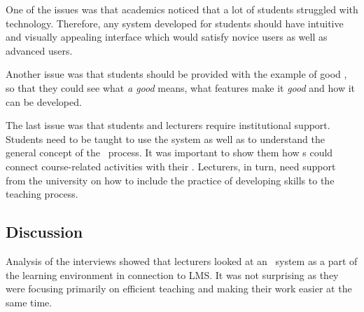 One of the issues was that academics noticed that a lot of students struggled
with technology. Therefore, any system developed for students should have
intuitive and visually appealing interface which would satisfy novice users as
well as advanced users.



Another issue was that students should be provided with the example of good
\ep, so that they could see what \textit{a good \ep} means, what features make
it \textit{good} and how it can be developed.


The last issue was that students and lecturers require institutional support.
Students need to be taught to use the system as well as to understand the
general concept of the \ep~process. It was important to show them how \ep s
could connect course-related activities with their \LLLsn. Lecturers, in turn,
need support from the university on how to include the practice of developing
\LLLs skills to the teaching process.

 
\subsection{Discussion}
Analysis of the interviews showed that lecturers looked at an \ep~system as a
part of the learning environment in connection to LMS. It was not surprising as
they were focusing primarily on efficient teaching and making their work easier
at the same time.

